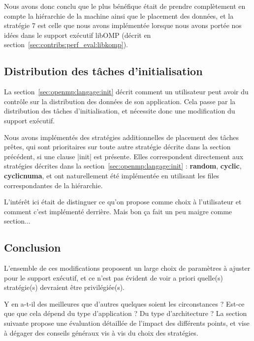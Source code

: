 Nous avons donc conclu que le plus bénéfique était de prendre complètement en compte la hiérarchie de la machine ainsi que le placement des données, et la stratégie 7 est celle que nous avons implémentée lorsque nous avons portée nos idées dans le support exécutif libOMP (décrit en section~\ref{sec:contribs:perf_eval:libkomp}).


\subsection{Distribution des tâches d'initialisation}


La section~\ref{sec:openmp:langage:init} décrit comment un utilisateur peut avoir du contrôle sur la distribution des données de son application.
Cela passe par la distribution des tâches d'initialisation, et nécessite donc une modification du support exécutif.

Nous avons implémentés des stratégies additionnelles de placement des tâches prêtes, qui sont prioritaires sur toute autre stratégie décrite dans la section précédent, si une clause |init| est présente.
Elles correspondent directement aux stratégies décrites dans la section~\ref{sec:openmp:langage:init} : \textbf{random}, \textbf{cyclic}, \textbf{cyclicnuma}, et ont naturellement été implémentée en utilisant les files correspondantes de la hiérarchie.

\begin{todo}
  L'intérêt ici était de distinguer ce qu'on propose comme choix à l'utilisateur et comment c'est implémenté derrière.
  Mais bon ça fait un peu maigre comme section...
\end{todo}


\subsection*{Conclusion}

L'ensemble de ces modifications proposent un large choix de paramètres à ajuster pour le support exécutif, et ce n'est pas évident de voir a priori quelle(s) stratégie(s) devraient être privilégiée(s).

Y en a-t-il des meilleures que d'autres quelques soient les circonstances ?
Est-ce que que cela dépend du type d'application ? Du type d'architecture ?
La section suivante propose une évaluation détaillée de l'impact des différents points, et vise à dégager des conseils généraux vis à vis du choix des stratégies.

